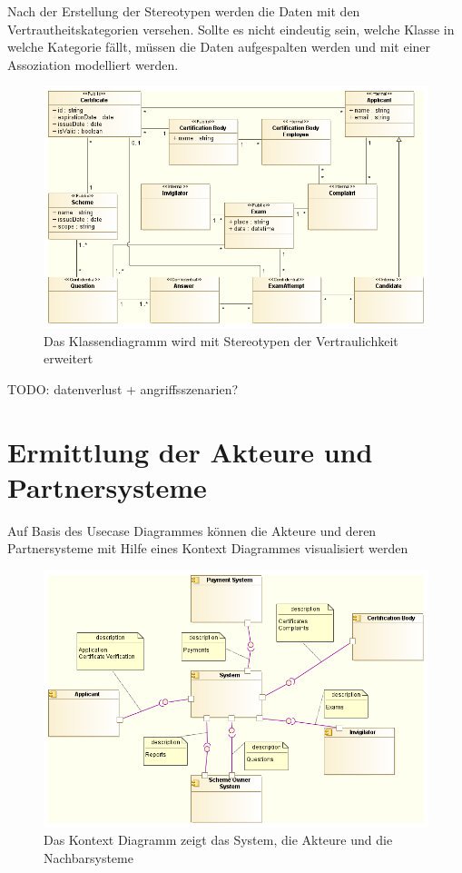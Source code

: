Nach der Erstellung der Stereotypen werden die Daten mit den Vertrautheitskategorien versehen. Sollte es nicht eindeutig sein, welche Klasse in welche Kategorie fällt, müssen die Daten aufgespalten werden und mit einer Assoziation modelliert werden.

\begin{figure}[!htbp]
    \centering
    \includegraphics[scale=0.5]{uml/classstereotyped.png}
    \caption{Das Klassendiagramm wird mit Stereotypen der Vertraulichkeit erweitert}
\end{figure}

TODO: datenverlust + angriffsszenarien?

\section{Ermittlung der Akteure und Partnersysteme}
Auf Basis des Usecase Diagrammes können die Akteure und deren Partnersysteme mit Hilfe eines Kontext Diagrammes visualisiert werden

\begin{figure}[H]
    \centering
    \includegraphics[scale=0.5]{uml/context.png}
    \caption{Das Kontext Diagramm zeigt das System, die Akteure und die Nachbarsysteme}
\end{figure}